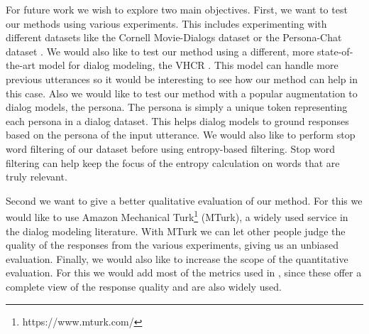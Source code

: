 \documentclass[11pt,a4paper]{article}
\begin{document}
For future work we wish to explore two main objectives. First, we want to test our methods using various experiments. This includes experimenting with different datasets like the Cornell Movie-Dialogs dataset \cite{Danescu:2011} or the Persona-Chat dataset \cite{Zhang:2018}. We would also like to test our method using a different, more state-of-the-art model for dialog modeling, the VHCR \cite{Park:2018}. This model can handle more previous utterances so it would be interesting to see how our method can help in this case. Also we would like to test our method with a popular augmentation to dialog models, the persona. The persona is simply a unique token representing each persona in a dialog dataset. This helps dialog models to ground responses based on the persona of the input utterance. We would also like to perform stop word filtering of our dataset before using entropy-based filtering. Stop word filtering can help keep the focus of the entropy calculation on words that are truly relevant.

Second we want to give a better qualitative evaluation of our method. For this we would like to use Amazon Mechanical Turk\footnote{https://www.mturk.com/} (MTurk), a widely used service in the dialog modeling literature. With MTurk we can let other people judge the quality of the responses from the various experiments, giving us an unbiased evaluation. Finally, we would also like to increase the scope of the quantitative evaluation. For this we would add most of the metrics used in \cite{Shen:2018}, since these offer a complete view of the response quality and are also widely used.




\end{document}
